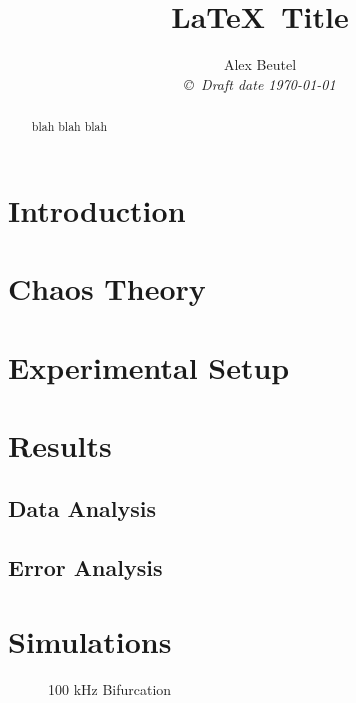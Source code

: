 \documentclass[12pt]{report}
\title{\LaTeX \ Title }
\author{Alex Beutel  \\
{\small\em \copyright \  Draft date \today }}
\date{ }
\begin{document}
\maketitle
\begin{abstract}
	blah blah blah
\end{abstract}
\tableofcontents
\listoffigures
\listoftables

\pagestyle{headings}

\pagestyle{plain}

\chapter{Introduction}

\chapter{Chaos Theory}

\chapter{Experimental Setup}

\chapter{Results}

\section{Data Analysis} %
\label{sec:Data Analysis}


\section{Error Analysis} %
\label{sec:Error Analysis}


\chapter{Simulations} %
\label{ch:Simulations}


	\begin{figure}[h]
		\centering
		
		\label{fig:100khzBifurcation}
		\caption{100 kHz Bifurcation}
	\end{figure}
	
\end{document}
